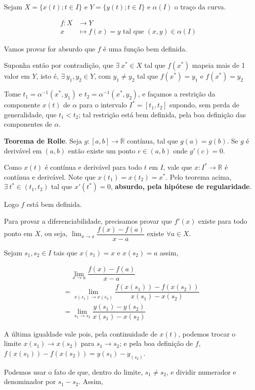 \documentclass[12pt,letterpaper]{article}
\begin{document}
\begin{enumerate}
	Sejam $X=\{x(t);t \in  I\}$ e $Y=\{y(t);t\in I \}$ e $\alpha(I)$ o traço da curva.
	
	\begin{align*}
		f: X &\to Y\\
		x&\mapsto f(x)=y\text{ tal que }(x,y)\in\alpha(I)
	\end{align*}
	
	Vamos provar for absurdo que $f$ é uma função bem definida.
	
	Suponha então por contradição, que $\exists~x^*\in X$ tal que $f(x^*)$ mapeia mais de 1 valor em $Y$, isto é, $\exists~y_1,y_2\in Y$, com $y_1\neq y_2$ tal que $f(x^*)=y_1$ e $f(x^*)=y_2$
	
	Tome $t_1=\alpha^{-1}(x^*,y_1)$ e $t_2=\alpha^{-1}(x^*,y_2)$, e façamos a restrição da componente $x(t)$ de $\alpha$ para o intervalo $I^*=[t_1,t_2]$ supondo, sem perda de generalidade, que $t_1<t_2$; tal restrição está bem definida, pela boa definição das componentes de $\alpha$.
	
	
	\textbf{Teorema de Rolle}\cite{lima1981curso}. Seja $g:[a,b]\to\mathbb{R}$ contínua, tal que $g(a)=g(b)$. Se $g$ é derivável em $(a,b)$ então existe um ponto $c\in(a,b)$ onde $g'(c)=0$.
	
	Como $x(t)$ é contínua e derivável para todo $t$ em $I$, vale que $x:I^*\to\mathbb{R}$ é contínua e derivável. Note que $x(t_1)=x(t_2)=x^*$. Pelo teorema acima, $\exists ~t^*\in(t_1,t_2)$ tal que $x'(t^*)=0$, \textbf{absurdo, pela hipótese de regularidade}.
	
	Logo $f$ está bem definida.
	
	Para provar a diferenciabilidade, precisamos provar que $f'(x)$ existe para todo ponto em $X$, ou seja, $\lim_{x\to a}\dfrac{f(x)-f(a)}{x-a}$ existe $\forall a \in X$.
	
	Sejam $s_1,s_2\in I$ tais que $x(s_1)=x$ e $x(s_2)=a$ assim,
	
	\begin{align*}&~~~~~\lim_{x\to a}\dfrac{f(x)-f(a)}{x-a}\\&=\lim_{x(s_1)\to x(s_2)}\dfrac{f(x(s_1))-f(x(s_2))}{x(s_1)-x(s_2)}\\&=\lim_{s_1\to s_2}\dfrac{y(s_1)-y(s_2)}{x(s_1)-x(s_2)}\end{align*}
	
	A última igualdade vale pois, pela continuidade de $x(t)$, podemos trocar o limite $x(s_1)\to x(s_2)$ para $s_1\to s_2$; e pela boa definição de $f$, $f(x(s_1))-f(x(s_2))=y(s_1)-y_(s_2)$.
	
	Podemos usar o fato de que, dentro do limite, $s_1\neq s_2$, e dividir numerador e denominador por $s_1-s_2$. Assim,
	

\end{enumerate}
\end{document}
